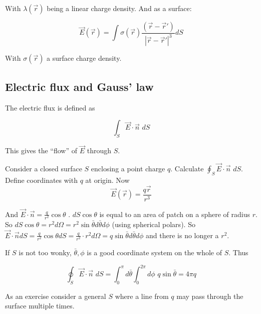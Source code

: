 With $\lambda(\vec{r})$ being a linear charge density. And as a surface:

\begin{equation}
\vec{E}(\vec{r}) = \int \sigma (\vec{r}) \frac{(\vec{r} - \vec{r}')}{| \vec{r} - \vec{r}'|^3} dS
\end{equation}

With $\sigma (\vec{r})$ a surface charge density.

\subsection{Electric flux and Gauss' law}

The electric flux is defined as

\begin{equation}
\displaystyle \int_S \vec{E} \cdot \vec{n} \, \, dS
\end{equation}

This gives the ``flow'' of $\vec{E}$ through $S$.

\vspace{\baselineskip}

Consider a closed surface $S$ enclosing a point charge $q$. Calculate $\oint_S \vec{E} \cdot \vec{n} \, \, dS$. Define coordinates with $q$ at origin. Now $$\vec{E}(\vec{r}) = \frac{q \vec{r}}{r^3}$$

And $\vec{E} \cdot \vec{n} = \frac{q}{r^2} \cos \theta \, \,$. $dS \cos \theta$ is equal to an area of patch on a sphere of radius $r$. So $dS \cos \theta = r^2 d \Omega = r^2 \sin \bar{\theta} d \bar{\theta} d \phi$ (using spherical polars). So $\vec{E} \cdot \vec{n} dS = \frac{q}{r^2} \cos \theta dS = \frac{q}{r^2} \cdot r^2 d \Omega = q \sin \bar{\theta} d \bar{\theta} d \phi$ and there is no longer a $r^2$.

If $S$ is not too wonky, $\bar{\theta}, \phi$ is a good coordinate system on the whole of $S$. Thus

\begin{equation}
\oint_S \vec{E} \cdot \vec{n} \, \, dS = \int_0^{\pi} d \! \bar{\theta} \int_0^{2 \pi} d \! \phi \, \, q \sin \bar{\theta} = 4 \pi q
\end{equation}

As an exercise consider a general $S$ where a line from $q$ may pass through the surface multiple times.